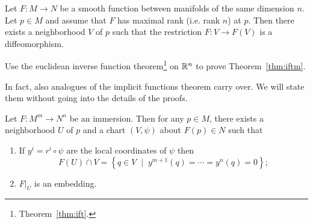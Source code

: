 \begin{theorem}\label{thm:iftm}
  Let $F:M\to N$ be a smooth function between manifolds of the same dimension $n$.
  Let $p\in M$ and assume that $F$ has maximal rank (i.e. rank $n$) at $p$.
  Then there exists a neighborhood $V$ of $p$ such that the restriction $F:V\to F(V)$ is a diffeomorphism.
\end{theorem}
\begin{exercise}
  Use the euclidean inverse function theorem\footnote{Theorem~\ref{thm:ift}.} on $\mathbb{R}^n$ to prove Theorem~\ref{thm:iftm}.
\end{exercise}


In fact, also analogues of the implicit functions theorem carry over.
We will state them without going into the details of the proofs.

\begin{proposition}\label{prop:slice_chart}
  Let $F:M^m\to N^n$ be an immersion.
  Then for any $p\in M$, there exists a neighborhood $U$ of $p$ and a chart $(V,\psi)$ about $F(p)\in N$ such that
  \begin{enumerate}
    \item If $y^i = r^i\circ \psi$ are the local coordinates of $\psi$ then
    \begin{equation}\label{eq:slice_chart}
      F(U)\cap V = \left\{ q \in V \;\mid\; y^{m+1}(q)=\cdots=y^n(q)=0\right\};
    \end{equation}
    \item $F\big|_U$ is an embedding.
  \end{enumerate}
 \end{proposition}

